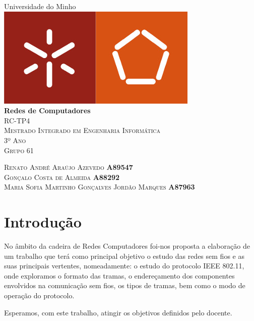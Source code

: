 \documentclass{article}
\begin{document}
\begin{capa}
	\begin{center}
	\vspace*{1.0cm}
	\huge{Universidade do Minho}\\
	[1.0cm]
	\includegraphics{logo.jpg}\\
	[1.5cm]
	\huge{\textbf{Redes de Computadores}}\\
	[0.5cm]
	\textsc{RC-TP4}\\
	\textsc{\normalsize{Mestrado Integrado em Engenharia Informática}}\\
	\textsc{\normalsize{3º Ano}}\\
	\textsc{\normalsize{Grupo 61}}\\
	[12.0cm]
	\end{center}
	\begin{flushleft}
	\textsc{Renato André Araújo Azevedo \textbf{\hspace*{130pt} A89547}}\\
	\textsc{Gonçalo Costa de Almeida \textbf{\hspace*{151pt} A88292}}\\
	\textsc{Maria Sofia Martinho Gonçalves Jordão Marques \textbf{\hspace*{30pt} A87963}}\\
	\end{flushleft}
\end{capa}

\newpage
\tableofcontents
\newpage

\section{Introdução}
	No âmbito da cadeira de Redes Computadores foi-nos proposta a elaboração de um trabalho
	que terá como principal objetivo  o estudo das redes sem fios e as suas principais vertentes,
	nomeadamente: o estudo do protocolo IEEE 802.11, onde exploramos o formato das tramas,
	o endereçamento dos componentes envolvidos na comunicação sem fios,
	os tipos de tramas, bem como o modo de operação do protocolo.\par
	Esperamos, com este trabalho, atingir os objetivos definidos pelo docente. \\
\end{document}
